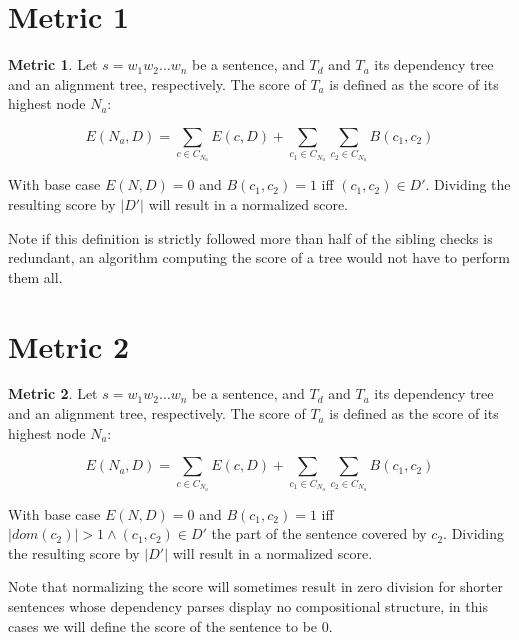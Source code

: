 \documentclass{report}
\theoremstyle{definition}
\newtheorem{metric}{Metric}
\theoremstyle{plain}
\begin{document}
\section{Metric 1}

\begin{metric}\label{m1}
Let $s = w_1 w_2 \dots w_n$ be a sentence, and $T_d$ and $T_a$ its dependency tree and an alignment tree, respectively. The score of $T_a$ is defined as the score of its highest node $N_{a}$:

$$
E(N_a,D) = \sum_{c\in C_{N_a}} E(c,D)+ \sum_{c_1\in C_{N_a}} \sum_{c_2\in C_{N_a}} B(c_1,c_2)
$$

\noindent With base case $E(N,D) = 0$ and $B(c_1,c_2) = 1$ iff  $(c_1,c_2)\in D'$. Dividing the resulting score by $|D'|$ will result in a normalized score.
\end{metric}

\noindent  Note if this definition is strictly followed more than half of the sibling checks is redundant, an algorithm computing the score of a tree would not have to perform them all.

\section{Metric 2}

\begin{metric}\label{m2}
Let $s = w_1 w_2 \dots w_n$ be a sentence, and $T_d$ and $T_a$ its dependency tree and an alignment tree, respectively. The score of $T_a$ is defined as the score of its highest node $N_{a}$:

$$
E(N_a,D) = \sum_{c\in C_{N_a}} E(c,D)+ \sum_{c_1\in C_{N_a}} \sum_{c_2\in C_{N_a}} B(c_1,c_2)
$$

\noindent With base case $E(N,D) = 0$ and $B(c_1,c_2) = 1$ iff  $|dom(c_2)| > 1 \land (c_1,c_2)\in D'$ the part of the sentence covered by $c_2$. Dividing the resulting score by $|D'|$ will result in a normalized score.
\end{metric}

Note that normalizing the score will sometimes result in zero division for shorter sentences whose dependency parses display no compositional structure, in this cases we will define the score of the sentence to be 0.







\end{document}
